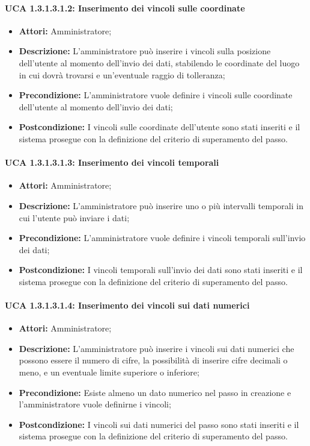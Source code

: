 \paragraph{UCA 1.3.1.3.1.2: Inserimento dei vincoli sulle coordinate}
\begin{itemize}
\item \textbf{Attori:}
 Amministratore;
\item \textbf{Descrizione:} 
L'amministratore può inserire i vincoli sulla posizione dell'utente al momento dell'invio dei dati, stabilendo le coordinate del luogo in cui dovrà trovarsi e un'eventuale raggio di tolleranza;
\item \textbf{Precondizione:} 
L'amministratore vuole definire i vincoli sulle coordinate dell'utente al momento dell'invio dei dati;
\item \textbf{Postcondizione:} 
I vincoli sulle coordinate dell'utente sono stati inseriti e il sistema prosegue con la definizione del criterio di superamento del passo.
\end{itemize}

\paragraph{UCA 1.3.1.3.1.3: Inserimento dei vincoli temporali}
\begin{itemize}
\item \textbf{Attori:}
 Amministratore;
\item \textbf{Descrizione:} 
L'amministratore può inserire uno o più intervalli temporali in cui l'utente può inviare i dati;
\item \textbf{Precondizione:} 
L'amministratore vuole definire i vincoli temporali sull'invio dei dati;
\item \textbf{Postcondizione:} 
I vincoli temporali sull'invio dei dati sono stati inseriti e il sistema prosegue con la definizione del criterio di superamento del passo.
\end{itemize}

\paragraph{UCA 1.3.1.3.1.4: Inserimento dei vincoli sui dati numerici}
\begin{itemize}
\item \textbf{Attori:}
 Amministratore;
\item \textbf{Descrizione:} 
L'amministratore può inserire i vincoli sui dati numerici che possono essere il numero di cifre, la possibilità di inserire cifre decimali o meno, e un eventuale limite superiore o inferiore;
\item \textbf{Precondizione:} 
Esiste almeno un dato numerico nel passo in creazione e l'amministratore vuole definirne i vincoli;
\item \textbf{Postcondizione:} 
I vincoli sui dati numerici del passo sono stati inseriti e il sistema prosegue con la definizione del criterio di superamento del passo.
\end{itemize}

